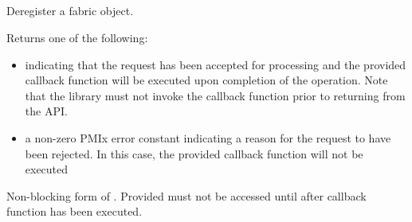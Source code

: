 \subsection{}

\summary

Deregister a fabric object.

\format


\begin{arglist}
\end{arglist}

Returns one of the following:

\begin{itemize}
\item {} indicating that the request has been accepted for processing and the provided callback function will be executed upon completion of the operation. Note that the library must not invoke the callback function prior to returning from the \ac{API}.
\item a non-zero \ac{PMIx} error constant indicating a reason for the request to have been rejected. In this case, the provided callback function will not be executed
\end{itemize}

\descr

Non-blocking form of . Provided  must not be accessed until after callback function has been executed.



